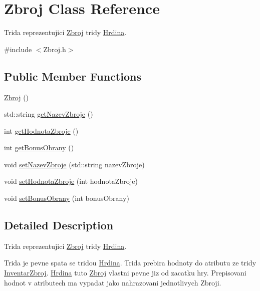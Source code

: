 \hypertarget{class_zbroj}{\section{Zbroj Class Reference}
\label{class_zbroj}
}


Trida reprezentujici \hyperlink{class_zbroj}{Zbroj} tridy \hyperlink{class_hrdina}{Hrdina}.  




{\ttfamily \#include $<$Zbroj.\-h$>$}

\subsection*{Public Member Functions}
\begin{DoxyCompactItemize}
\item 
\hyperlink{class_zbroj_a21757359e8fdc9bdbc3d61ed3b56addd}{Zbroj} ()
\item 
std\-::string \hyperlink{class_zbroj_a78a06a169d6598b31ef8596e72db2135}{get\-Nazev\-Zbroje} ()
\item 
int \hyperlink{class_zbroj_a8bf68cd0ac7a89a58df81ebc54ce7495}{get\-Hodnota\-Zbroje} ()
\item 
int \hyperlink{class_zbroj_aff4015ac976d4b7b52f94d64a9d8de7d}{get\-Bonus\-Obrany} ()
\item 
void \hyperlink{class_zbroj_a616cce471a3d48834f322ef85f4ebefc}{set\-Nazev\-Zbroje} (std\-::string nazev\-Zbroje)
\item 
void \hyperlink{class_zbroj_a407427188d4771876fbe8578991fa840}{set\-Hodnota\-Zbroje} (int hodnota\-Zbroje)
\item 
void \hyperlink{class_zbroj_a692fa295def3a79d04623d4bb55a0d67}{set\-Bonus\-Obrany} (int bonus\-Obrany)
\end{DoxyCompactItemize}


\subsection{Detailed Description}
Trida reprezentujici \hyperlink{class_zbroj}{Zbroj} tridy \hyperlink{class_hrdina}{Hrdina}. 

Trida je pevne spata se tridou \hyperlink{class_hrdina}{Hrdina}. Trida prebira hodnoty do atributu ze tridy \hyperlink{class_inventar_zbroj}{Inventar\-Zbroj}. \hyperlink{class_hrdina}{Hrdina} tuto \hyperlink{class_zbroj}{Zbroj} vlastni pevne jiz od zacatku hry. Prepisovani hodnot v atributech ma vypadat jako nahrazovani jednotlivych Zbroji. 


